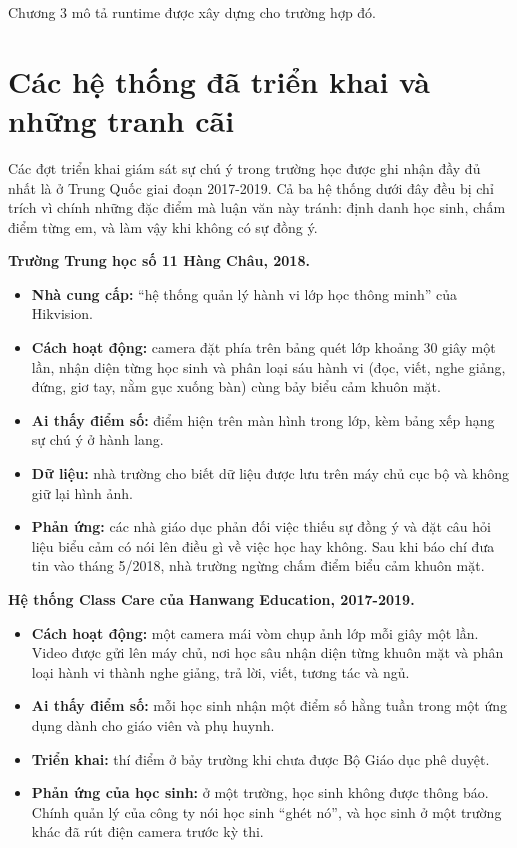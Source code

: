 Chương 3 mô tả runtime được xây dựng cho trường hợp đó.

\section{Các hệ thống đã triển khai và những tranh cãi}

Các đợt triển khai giám sát sự chú ý trong trường học được ghi nhận đầy đủ nhất là ở Trung Quốc giai đoạn 2017-2019. Cả ba hệ thống dưới đây đều bị chỉ trích vì chính những đặc điểm mà luận văn này tránh: định danh học sinh, chấm điểm từng em, và làm vậy khi không có sự đồng ý.

\textbf{Trường Trung học số 11 Hàng Châu, 2018. \cite{b7,b8,b9,b10}}

\begin{itemize}
\tightlist
\item
  \textbf{Nhà cung cấp:} ``hệ thống quản lý hành vi lớp học thông minh'' của Hikvision.
\item
  \textbf{Cách hoạt động:} camera đặt phía trên bảng quét lớp khoảng 30 giây một lần, nhận diện từng học sinh và phân loại sáu hành vi (đọc, viết, nghe giảng, đứng, giơ tay, nằm gục xuống bàn) cùng bảy biểu cảm khuôn mặt.
\item
  \textbf{Ai thấy điểm số:} điểm hiện trên màn hình trong lớp, kèm bảng xếp hạng sự chú ý ở hành lang.
\item
  \textbf{Dữ liệu:} nhà trường cho biết dữ liệu được lưu trên máy chủ cục bộ và không giữ lại hình ảnh.
\item
  \textbf{Phản ứng:} các nhà giáo dục phản đối việc thiếu sự đồng ý và đặt câu hỏi liệu biểu cảm có nói lên điều gì về việc học hay không. Sau khi báo chí đưa tin vào tháng 5/2018, nhà trường ngừng chấm điểm biểu cảm khuôn mặt.
\end{itemize}

\textbf{Hệ thống Class Care của Hanwang Education, 2017-2019. \cite{b10}}

\begin{itemize}
\tightlist
\item
  \textbf{Cách hoạt động:} một camera mái vòm chụp ảnh lớp mỗi giây một lần. Video được gửi lên máy chủ, nơi học sâu nhận diện từng khuôn mặt và phân loại hành vi thành nghe giảng, trả lời, viết, tương tác và ngủ.
\item
  \textbf{Ai thấy điểm số:} mỗi học sinh nhận một điểm số hằng tuần trong một ứng dụng dành cho giáo viên và phụ huynh.
\item
  \textbf{Triển khai:} thí điểm ở bảy trường khi chưa được Bộ Giáo dục phê duyệt.
\item
  \textbf{Phản ứng của học sinh:} ở một trường, học sinh không được thông báo. Chính quản lý của công ty nói học sinh ``ghét nó'', và học sinh ở một trường khác đã rút điện camera trước kỳ thi.
\end{itemize}

